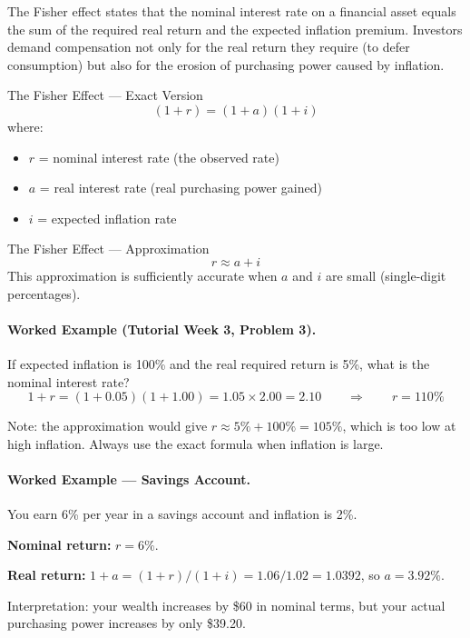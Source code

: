 \documentclass[11pt,a4paper]{article}
\begin{document}
The Fisher effect states that the nominal interest rate on a financial asset equals the sum of the required real return and the expected inflation premium. Investors demand compensation not only for the real return they require (to defer consumption) but also for the erosion of purchasing power caused by inflation.

\begin{formulabox}{The Fisher Effect --- Exact Version}
\[
  (1 + r) = (1 + a)(1 + i)
\]
where:
\begin{itemize}
  \item $r$ = nominal interest rate (the observed rate)
  \item $a$ = real interest rate (real purchasing power gained)
  \item $i$ = expected inflation rate
\end{itemize}
\end{formulabox}

\begin{formulabox}{The Fisher Effect --- Approximation}
\[
  r \approx a + i
\]
This approximation is sufficiently accurate when $a$ and $i$ are small (single-digit percentages).
\end{formulabox}

\paragraph{Worked Example (Tutorial Week 3, Problem 3).}

If expected inflation is 100\% and the real required return is 5\%, what is the nominal interest rate?
\[
  1 + r = (1 + 0.05)(1 + 1.00) = 1.05 \times 2.00 = 2.10 \qquad \Rightarrow \qquad r = 110\%
\]

Note: the approximation would give $r \approx 5\% + 100\% = 105\%$, which is too low at high inflation. Always use the exact formula when inflation is large.

\paragraph{Worked Example --- Savings Account.}

You earn 6\% per year in a savings account and inflation is 2\%.

\textbf{Nominal return:} $r = 6\%$.

\textbf{Real return:} $1 + a = (1 + r)/(1 + i) = 1.06/1.02 = 1.0392$, so $a = 3.92\%$.

Interpretation: your wealth increases by \$60 in nominal terms, but your actual purchasing power increases by only \$39.20.
\end{document}
